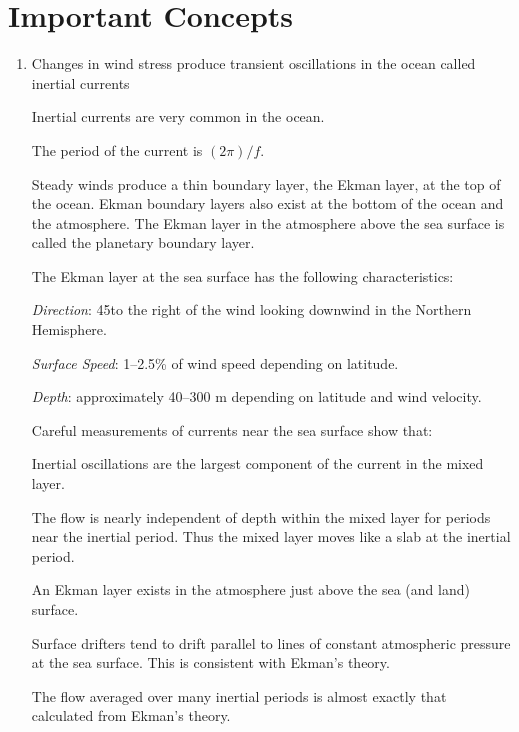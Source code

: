 \section{Important Concepts}
\begin{enumerate}
\item Changes in wind stress
produce transient oscillations in the ocean called inertial
currents
\begin{enumerate}
\vitem Inertial currents are very common in the ocean.
  
\vitem The period of the current is $(2 \pi)/f$.
\end{enumerate}

\vitem Steady winds produce a thin boundary layer, the Ekman layer, at
the top of the ocean. Ekman boundary layers also exist at the bottom
of the ocean and the atmosphere.  The Ekman layer in the atmosphere
above the sea surface is called the planetary boundary layer.

\vitem The Ekman layer at the sea
surface has the following characteristics:
\begin{enumerate}
\vitem \textit{Direction}: 45\degrees to the right of the wind looking
downwind in the Northern Hemisphere.

\vitem \textit{Surface Speed}: 1--2.5\% of wind speed depending on
latitude.

\vitem \textit{Depth}: approximately 40--300 m depending on latitude
and wind velocity.
\end{enumerate}

\vitem Careful measurements of currents near the sea surface show
that:
\begin{enumerate}
\vitem Inertial oscillations are the largest component of the current
in the mixed layer.

\vitem The flow is nearly independent of depth within the mixed
layer for periods near the inertial
period. Thus the mixed layer moves like a slab
at the inertial period.

\vitem An Ekman layer exists in the atmosphere just above the sea (and
land) surface.

\vitem Surface drifters tend to drift parallel to
lines of constant atmospheric pressure at the sea surface. This is
consistent with Ekman's theory.

\vitem The flow averaged over many inertial periods is almost exactly
that calculated from Ekman's theory.
\end{enumerate}


\end{enumerate}
